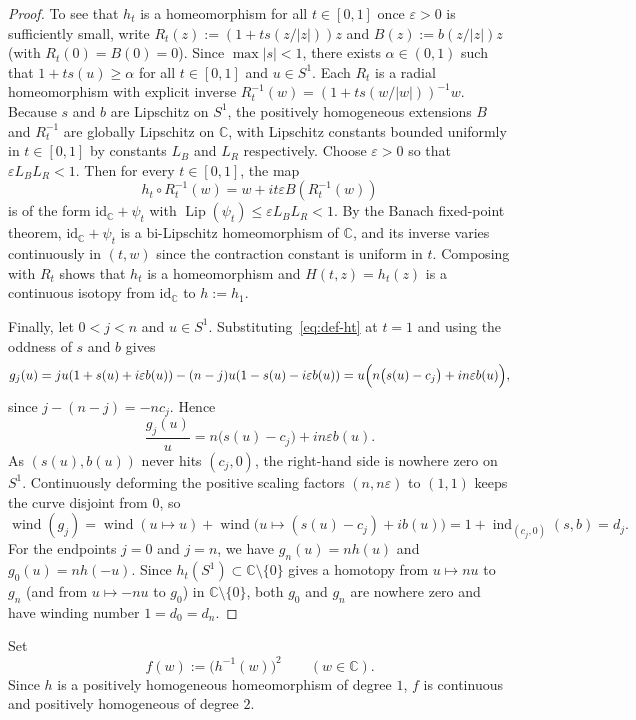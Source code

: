 \documentclass[11pt,a4paper]{amsart}
\numberwithin{equation}{section}
\theoremstyle{definition}
\newcommand{\C}{\mathbb{C}}
\newcommand{\ind}{\operatorname{ind}}
\newcommand{\wind}{\operatorname{wind}}
\newcommand{\Lip}{\operatorname{Lip}}
\begin{document}
\begin{proof}
To see that $h_t$ is a homeomorphism for all $t \in [0,1]$ once $\varepsilon > 0$ is sufficiently small, write $R_t(z) := (1 + t s(z/|z|)) z$ and $B(z) := b(z/|z|) z$ (with $R_t(0) = B(0) = 0$). Since $\max |s| < 1$, there exists $\alpha \in (0,1)$ such that $1 + t s(u) \ge \alpha$ for all $t \in [0,1]$ and $u \in S^1$. Each $R_t$ is a radial homeomorphism with explicit inverse $R_t^{-1}(w) = (1 + t s(w/|w|))^{-1} w$. Because $s$ and $b$ are Lipschitz on $S^1$, the positively homogeneous extensions $B$ and $R_t^{-1}$ are globally Lipschitz on $\C$, with Lipschitz constants bounded uniformly in $t \in [0,1]$ by constants $L_B$ and $L_R$ respectively. Choose $\varepsilon > 0$ so that $\varepsilon L_B L_R < 1$. Then for every $t \in [0,1]$, the map
\[
h_t \circ R_t^{-1}(w) = w + i t \varepsilon B(R_t^{-1}(w))
\]
is of the form $\mathrm{id}_\C + \psi_t$ with $\Lip(\psi_t) \le \varepsilon L_B L_R < 1$. By the Banach fixed-point theorem, $\mathrm{id}_\C + \psi_t$ is a bi-Lipschitz homeomorphism of $\C$, and its inverse varies continuously in $(t,w)$ since the contraction constant is uniform in $t$. Composing with $R_t$ shows that $h_t$ is a homeomorphism and $H(t,z) = h_t(z)$ is a continuous isotopy from $\mathrm{id}_\C$ to $h := h_1$.

Finally, let $0 < j < n$ and $u \in S^1$. Substituting~\eqref{eq:def-ht} at $t=1$ and using the oddness of $s$ and $b$ gives
\[
g_j(u) = j u(1 + s(u) + i\varepsilon b(u)) - (n-j) u(1 - s(u) - i\varepsilon b(u))
= u \Bigl( n\bigl(s(u) - c_j\bigr) + i n\varepsilon b(u) \Bigr),
\]
since $j - (n-j) = -n c_j$. Hence
\[
\frac{g_j(u)}{u} = n\bigl(s(u) - c_j\bigr) + i n\varepsilon b(u).
\]
As $(s(u), b(u))$ never hits $(c_j, 0)$, the right-hand side is nowhere zero on $S^1$. Continuously deforming the positive scaling factors $(n, n\varepsilon)$ to $(1,1)$ keeps the curve disjoint from $0$, so
\[
\wind(g_j) = \wind(u \mapsto u) + \wind\bigl(u \mapsto (s(u)-c_j) + i b(u)\bigr) = 1 + \ind_{(c_j,0)}(s,b) = d_j.
\]
For the endpoints $j=0$ and $j=n$, we have $g_n(u) = n h(u)$ and $g_0(u) = n h(-u)$. Since $h_t(S^1) \subset \C \setminus \{0\}$ gives a homotopy from $u \mapsto n u$ to $g_n$ (and from $u \mapsto -n u$ to $g_0$) in $\C \setminus \{0\}$, both $g_0$ and $g_n$ are nowhere zero and have winding number $1 = d_0 = d_n$.
\end{proof}

Set
\begin{equation}
\label{eq:def-f}
f(w) := \bigl(h^{-1}(w)\bigr)^2 \qquad (w \in \C).
\end{equation}
Since $h$ is a positively homogeneous homeomorphism of degree $1$, $f$ is continuous and positively homogeneous of degree $2$.
\end{document}

